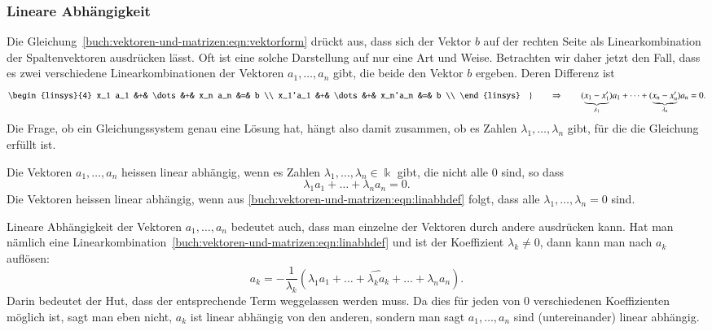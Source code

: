 \subsubsection{Lineare Abhängigkeit}
Die Gleichung~\eqref{buch:vektoren-und-matrizen:eqn:vektorform}
drückt aus, dass sich der Vektor $b$ auf der rechten Seite als
Linearkombination der Spaltenvektoren ausdrücken lässt.
Oft ist eine solche Darstellung auf nur eine Art und Weise.
Betrachten wir daher jetzt den Fall, dass es zwei verschiedene
Linearkombinationen der Vektoren $a_1,\dots,a_n$ gibt, die beide den
Vektor $b$ ergeben.
Deren Differenz ist
\begin{equation}
\left.
\begin{linsys}{4}
x_1 a_1 &+& \dots &+& x_n a_n &=& b \\
x_1'a_1 &+& \dots &+& x_n'a_n &=& b \\
\end{linsys}
\quad\right\}
\qquad
\Rightarrow
\qquad
(\underbrace{x_1-x_1'}_{\lambda_1}) a_1
+
\dots
+
(\underbrace{x_n-x_n'}_{\lambda_n}) a_n
=
0.
\label{buch:vektoren-und-matrizen:eqn:linabhkomb}
\end{equation}
Die Frage, ob ein Gleichungssystem genau eine Lösung hat, hängt also
damit zusammen, ob es Zahlen $\lambda_1,\dots,\lambda_n$ gibt, für
die die Gleichung~\label{buch:vektoren-und-matrizen:eqn:linabhkomb}
erfüllt ist.

\begin{definition}
Die Vektoren $a_1,\dots,a_n$ heissen linear abhängig, wenn es Zahlen
$\lambda_1,\dots,\lambda_n\in\Bbbk$ gibt, die nicht alle $0$ sind, so dass
\begin{equation}
\lambda_1a_1+\dots+\lambda_na_n = 0.
\label{buch:vektoren-und-matrizen:eqn:linabhdef}
\end{equation}
Die Vektoren heissen linear abhängig, wenn aus
\eqref{buch:vektoren-und-matrizen:eqn:linabhdef}
folgt, dass alle $\lambda_1,\dots,\lambda_n=0$ sind.
\end{definition}

Lineare Abhängigkeit der Vektoren $a_1,\dots,a_n$ bedeutet auch, dass
man einzelne der Vektoren durch andere ausdrücken kann.
Hat man nämlich eine
Linearkombination~\eqref{buch:vektoren-und-matrizen:eqn:linabhdef} und 
ist der Koeffizient $\lambda_k\ne 0$, dann kann man nach $a_k$ auflösen:
\[
a_k = -\frac{1}{\lambda_k}(\lambda_1a_1+\dots+\widehat{\lambda_ka_k}+\dots+\lambda_na_n).
\]
Darin bedeutet der Hut, dass der entsprechende Term weggelassen werden
muss.
Da dies für jeden von $0$ verschiedenen Koeffizienten möglich ist,
sagt man eben nicht, $a_k$ ist linear abhängig von den anderen, sondern
man sagt $a_1,\dots,a_n$ sind (untereinander) linear abhängig.


